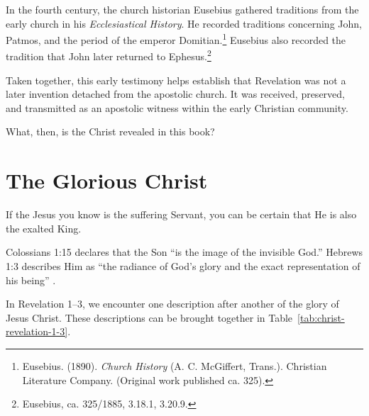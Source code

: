 In the fourth century, the church historian Eusebius gathered traditions from the early church in his \textit{Ecclesiastical History}. He recorded traditions concerning John, Patmos, and the period of the emperor Domitian.\footnote{Eusebius. (1890). \textit{Church History} (A. C. McGiffert, Trans.). Christian Literature Company. (Original work published ca. 325).} Eusebius also recorded the tradition that John later returned to Ephesus.\footnote{Eusebius, ca. 325/1885, 3.18.1, 3.20.9.}

Taken together, this early testimony helps establish that Revelation was not a later invention detached from the apostolic church. It was received, preserved, and transmitted as an apostolic witness within the early Christian community.

What, then, is the Christ revealed in this book?

\section{The Glorious Christ}

If the Jesus you know is the suffering Servant, you can be certain that He is also the exalted King.

Colossians 1:15 declares that the Son ``is the image of the invisible God.'' Hebrews 1:3 describes Him as ``the radiance of God's glory and the exact representation of his being''  .

In Revelation 1--3, we encounter one description after another of the glory of Jesus Christ. These descriptions can be brought together in Table~\ref{tab:christ-revelation-1-3}.

